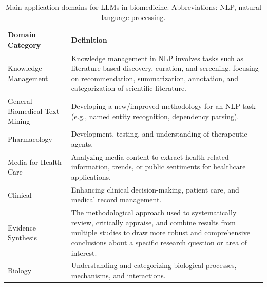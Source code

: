 \documentclass[fleqn,10pt]{olplainarticle}
\begin{document}
\begin{table}[h]
\centering
\begin{tabular}{l p{10cm}}
\hline
\textbf{Domain Category}       & \textbf{Definition}                                                                                                          \\ \hline
Knowledge Management           & Knowledge management in NLP involves tasks such as literature-based discovery, curation, and screening, focusing on recommendation, summarization, annotation, and categorization of scientific literature.                         \\ \hline
General Biomedical Text Mining & Developing a new/improved methodology for an NLP task (e.g., named entity recognition, dependency parsing).                                        \\ \hline
Pharmacology                   & Development, testing, and understanding of therapeutic agents.                                                                 \\ \hline
Media for Health Care          & Analyzing media content to extract health-related information, trends, or public sentiments for healthcare applications.                                                                          \\ \hline
Clinical                       & Enhancing clinical decision-making, patient care, and medical record management.                                                                            \\ \hline
Evidence Synthesis             & The methodological approach used to systematically review, critically appraise, and combine results from multiple studies to draw more robust and comprehensive conclusions about a specific research question or area of interest. \\ \hline
Biology                        & Understanding and categorizing biological processes, mechanisms, and interactions.                                                                        \\ \hline
\end{tabular}
\caption{Main application domains for LLMs in biomedicine. Abbreviations: NLP, natural language processing.}
\label{table:domains_application}
\end{table}
\end{document}
